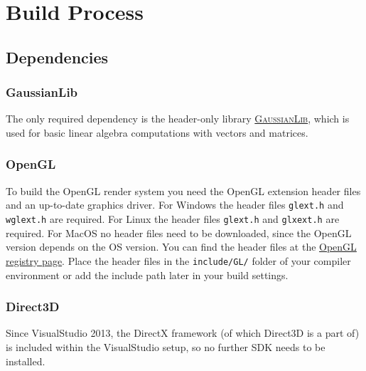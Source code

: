 \documentclass{article}
\begin{document}
\newpage
\section{Build Process}

\subsection{Dependencies}

\subsubsection{GaussianLib}

The only required dependency is the header-only library
\href{https://github.com/LukasBanana/GaussianLib}{\textsc{GaussianLib}},
which is used for basic linear algebra computations with vectors and matrices.

\subsubsection{OpenGL}

To build the OpenGL render system you need the OpenGL extension header files and an up-to-date graphics driver.
For Windows the header files \texttt{glext.h} and \texttt{wglext.h} are required.
For Linux the header files \texttt{glext.h} and \texttt{glxext.h} are required.
For MacOS no header files need to be downloaded, since the OpenGL version depends on the OS version.
You can find the header files at the \href{https://www.opengl.org/registry/#headers}{OpenGL registry page}.
Place the header files in the \texttt{include/GL/} folder of your compiler environment
or add the include path later in your build settings.

\subsubsection{Direct3D}

Since VisualStudio 2013, the DirectX framework (of which Direct3D is a part of) is included within
the VisualStudio setup, so no further SDK needs to be installed.


\end{document}
